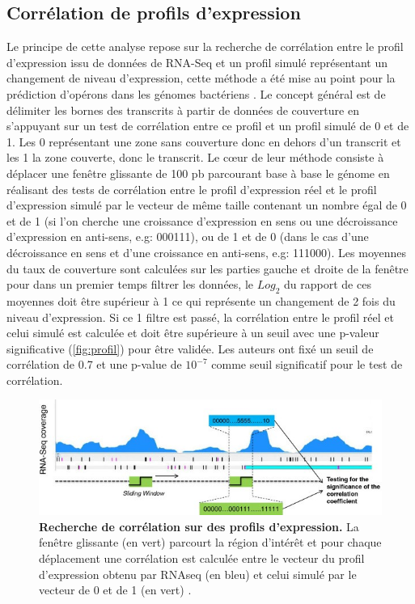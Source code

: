 \documentclass[12pt,a4paper]{report}
\begin{document}
\begin{onehalfspace}
\section*{Corrélation de profils d'expression}
\label{methode_correlation}
Le principe de cette analyse repose sur la recherche de corrélation entre le profil d'expression issu de données de RNA-Seq et un profil simulé représentant un changement de niveau d'expression, cette méthode a été mise au point pour la prédiction d'opérons dans les génomes bactériens \citep{Fortino2014}. Le concept général est de délimiter les bornes des transcrits à partir de données de couverture en s'appuyant sur un test de corrélation entre ce profil et un profil simulé de 0 et de 1. Les 0 représentant une zone sans couverture donc en dehors d'un transcrit et les 1 la zone couverte, donc le transcrit. Le cœur de leur méthode consiste à déplacer une fenêtre glissante de 100 pb parcourant base à base le génome en réalisant des tests de corrélation entre le profil d'expression réel et le profil d'expression simulé par le vecteur de même taille contenant un nombre égal de 0 et de 1 (si l'on cherche une croissance d'expression en sens ou une décroissance d'expression en anti-sens, e.g: 000111), ou de 1 et de 0 (dans le cas d'une décroissance en sens et d'une croissance en anti-sens, e.g: 111000). Les moyennes du taux de couverture sont calculées sur les parties gauche et droite de la fenêtre pour dans un premier temps filtrer les données, le $Log_2$ du rapport de ces moyennes doit être supérieur à 1 ce qui représente un changement de 2 fois du niveau d'expression. Si ce 1 filtre est passé, la corrélation entre le profil réel et celui simulé est calculée et doit être supérieure à un seuil avec une p-valeur significative (\autoref{fig:profil}) pour être validée. Les auteurs ont fixé un seuil de corrélation de 0.7 et une p-value de $10^{-7}$ comme seuil significatif pour le test de corrélation.

\begin{figure}[ht]
\centerline{\includegraphics[scale=0.6]{figures/profil.jpg}}
\caption{\textbf{Recherche de corrélation sur des profils d'expression.} La fenêtre glissante (en vert) parcourt la région d'intérêt et pour chaque déplacement une corrélation est calculée entre le vecteur du profil d'expression obtenu par RNAseq (en bleu) et celui simulé par le vecteur de 0 et de 1 (en vert) \citep{Fortino2014}.}
\label{fig:profil} 
\end{figure}


\end{onehalfspace}
\end{document}
